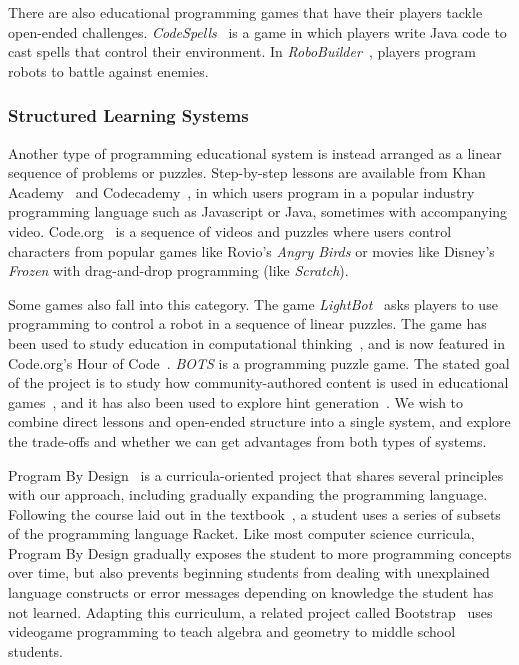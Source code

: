 \documentclass{sig-alternate}
\begin{document}
There are also educational programming games that have their players tackle open-ended challenges.
\emph{CodeSpells}~\cite{esper2013codespells} is a game in which players write Java code to cast spells that control their environment. 
In \emph{RoboBuilder}~\cite{weintrop2013robobuilder}, players program robots to battle against enemies.

\subsubsection{Structured Learning Systems}
Another type of programming educational system is instead arranged as a linear sequence of problems or puzzles.
Step-by-step lessons are available from Khan Academy~\cite{khanacademy} and Codecademy~\cite{codecademy}, in which users program in a popular industry programming language such as Javascript or Java, sometimes with accompanying video.
Code.org~\cite{codedotorg} is a sequence of videos and puzzles where users control characters from popular games like Rovio's \emph{Angry Birds} or movies like Disney's \emph{Frozen} with drag-and-drop programming (like \emph{Scratch}).

Some games also fall into this category.
The game \emph{LightBot}~\cite{lightbot} asks players to use programming to control a robot in a sequence of linear puzzles.
The game has been used to study education in computational thinking~\cite{Gouws13Lightbot}, and is now featured in Code.org's Hour of Code~\cite{lightbothoc}.
\emph{BOTS} is a programming puzzle game. The stated goal of the project is to study how community-authored content is used in educational games~\cite{hickspart14}, and it has also been used to explore hint generation~\cite{peddycord14generating}.
We wish to combine direct lessons and open-ended structure into a single system, and explore the trade-offs and whether we can get advantages from both types of systems.

Program By Design~\cite{programbydesign} is a curricula-oriented project that shares several principles with our approach, including gradually expanding the programming language. 
Following the course laid out in the textbook~\cite{felleisen2001design}, a student uses a series of subsets of the programming language Racket.
Like most computer science curricula, Program By Design gradually exposes the student to more programming concepts over time, but also prevents beginning students from dealing with unexplained language constructs or error messages depending on knowledge the student has not learned.
Adapting this curriculum, a related project called Bootstrap~\cite{bootstrap} uses videogame programming to teach algebra and geometry to middle school students.
\end{document}

